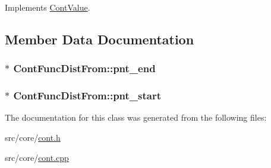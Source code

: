 Implements \hyperlink{a00086_ae3ce98084899bf1a873a1ec6bf15116e}{Cont\-Value}.



\subsection{Member Data Documentation}
\hypertarget{a00055_af5ec896aa9096b288b261444c42f0e54}{
\subsubsection[{pnt\-\_\-end}]{ $\ast$ Cont\-Func\-Dist\-From\-::pnt\-\_\-end\hspace{0.3cm}{\ttfamily [private]}}}\label{a00055_af5ec896aa9096b288b261444c42f0e54}
\hypertarget{a00055_a25338c27e80b5da31dcfd66fab8301b0}{
\subsubsection[{pnt\-\_\-start}]{$\ast$ Cont\-Func\-Dist\-From\-::pnt\-\_\-start\hspace{0.3cm}{\ttfamily [private]}}}\label{a00055_a25338c27e80b5da31dcfd66fab8301b0}


The documentation for this class was generated from the following files\-:\begin{DoxyCompactItemize}
\item 
src/core/\hyperlink{a00218}{cont.\-h}\item 
src/core/\hyperlink{a00217}{cont.\-cpp}\end{DoxyCompactItemize}
